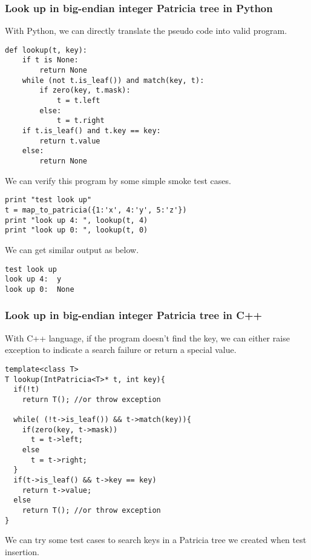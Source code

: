 \documentclass{article}
\begin{document}
\subsubsection*{Look up in big-endian integer Patricia tree in Python}
With Python, we can directly translate the pseudo code into valid
program.

\lstset{language=Python}
\begin{lstlisting}
def lookup(t, key):
    if t is None:
        return None
    while (not t.is_leaf()) and match(key, t):
        if zero(key, t.mask):
            t = t.left
        else:
            t = t.right
    if t.is_leaf() and t.key == key:
        return t.value
    else:
        return None
\end{lstlisting}

We can verify this program by some simple smoke test cases.

\begin{lstlisting}
print "test look up"
t = map_to_patricia({1:'x', 4:'y', 5:'z'})
print "look up 4: ", lookup(t, 4)
print "look up 0: ", lookup(t, 0)
\end{lstlisting}

We can get similar output as below.

\begin{verbatim}
test look up
look up 4:  y
look up 0:  None
\end{verbatim}

\subsubsection*{Look up in big-endian integer Patricia tree in C++}

With C++ language, if the program doesn't find the key, we can either
raise exception to indicate a search failure or return a special
value.

\lstset{language=C++}
\begin{lstlisting}
template<class T>
T lookup(IntPatricia<T>* t, int key){
  if(!t)
    return T(); //or throw exception

  while( (!t->is_leaf()) && t->match(key)){
    if(zero(key, t->mask))
      t = t->left;
    else
      t = t->right;
  }
  if(t->is_leaf() && t->key == key)
    return t->value;
  else
    return T(); //or throw exception
}
\end{lstlisting}

We can try some test cases to search keys in a Patricia tree we
created when test insertion.
\end{document}

